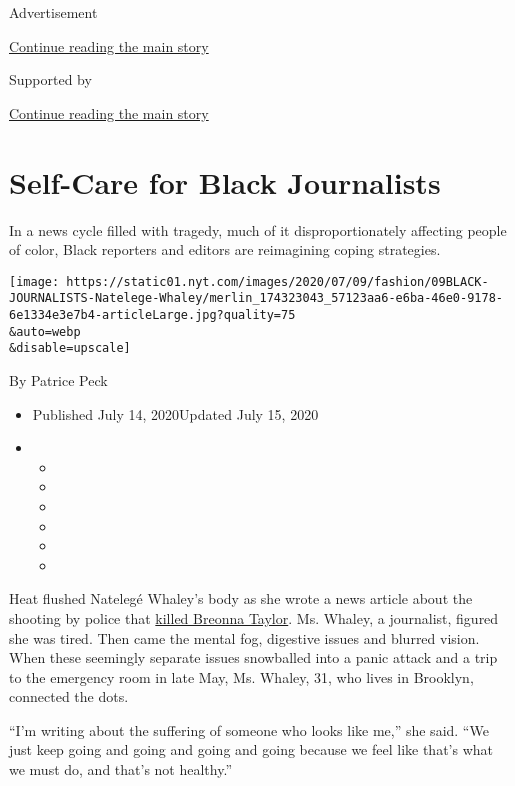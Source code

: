 Advertisement

\protect\hyperlink{after-top}{Continue reading the main story}

Supported by

\protect\hyperlink{after-sponsor}{Continue reading the main story}

\hypertarget{self-care-for-black-journalists}{%
\section{Self-Care for Black
Journalists}\label{self-care-for-black-journalists}}

In a news cycle filled with tragedy, much of it disproportionately
affecting people of color, Black reporters and editors are reimagining
coping strategies.

\texttt{[image: https://static01.nyt.com/images/2020/07/09/fashion/09BLACK-JOURNALISTS-Natelege-Whaley/merlin\_174323043\_57123aa6-e6ba-46e0-9178-6e1334e3e7b4-articleLarge.jpg?quality=75\\\&auto=webp\\\&disable=upscale]}

By Patrice Peck

\begin{itemize}
\item
  Published July 14, 2020Updated July 15, 2020
\item
  \begin{itemize}
  \item
  \item
  \item
  \item
  \item
  \item
  \end{itemize}
\end{itemize}

Heat flushed Natelegé Whaley's body as she wrote a news article about
the shooting by police that
\href{https://www.nytimes.com/article/breonna-taylor-police.html}{killed
Breonna Taylor}. Ms. Whaley, a journalist, figured she was tired. Then
came the mental fog, digestive issues and blurred vision. When these
seemingly separate issues snowballed into a panic attack and a trip to
the emergency room in late May, Ms. Whaley, 31, who lives in Brooklyn,
connected the dots.

``I'm writing about the suffering of someone who looks like me,'' she
said. ``We just keep going and going and going and going because we feel
like that's what we must do, and that's not healthy.''

